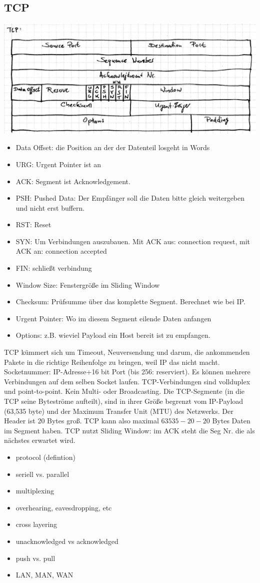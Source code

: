 \documentclass[10pt,a4paper]{scrartcl}
\begin{document}
\subsection*{TCP}
\includegraphics[width=\textwidth]{tcpheader.jpg}
\begin{itemize}
\item Data Offset: die Position an der der Datenteil losgeht in Words
\item URG: Urgent Pointer ist an
\item ACK: Segment ist Acknowledgement.
\item PSH: Pushed Data: Der Empfänger soll die Daten bitte gleich weitergeben und nicht erst buffern.
\item RST: Reset
\item SYN: Um Verbindungen auszubauen. Mit ACK aus: connection request, mit ACK an: connection accepted
\item FIN: schließt verbindung
\item Window Size: Fenstergröße im Sliding Window
\item Checksum: Prüfsumme über das komplette Segment. Berechnet wie bei IP.
\item Urgent Pointer: Wo im diesem Segment eilende Daten anfangen
\item Options: z.B. wieviel Payload ein Host bereit ist zu empfangen. 
\end{itemize}

TCP kümmert sich um Timeout, Neuversendung und darum, die ankommenden Pakete in die richtige Reihenfolge zu bringen, weil IP das nicht macht. Socketnummer: IP-Adresse+16 bit Port (bis 256: reserviert). Es können mehrere Verbindungen auf dem selben Socket laufen. TCP-Verbindungen sind vollduplex und point-to-point. Kein Multi- oder Broadcasting. Die TCP-Segmente (in die TCP seine Byteströme aufteilt), sind in ihrer Größe begrenzt vom IP-Payload (63,535 byte) und der Maximum Transfer Unit (MTU) des Netzwerks. Der Header ist 20 Bytes groß. TCP kann also maximal $63535-20-20$ Bytes Daten im Segment haben. TCP nutzt Sliding Window: im ACK steht die Seg Nr. die als nächstes erwartet wird. 


\begin{itemize}
\item  protocol (defintion)
\item  seriell vs. parallel
\item  multiplexing
\item  overhearing, eavesdropping, etc
\item  cross layering
\item  unacknowledged vs acknowledged
\item  push vs. pull
\item  LAN, MAN, WAN
\end{itemize}
\end{document}
